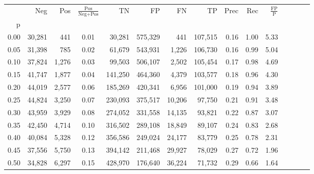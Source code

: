 \begin{tabular}{rrrcrrrrrrrrrrr}
\toprule
{} &     Neg &     Pos & $\frac{\text{Pos}}{\text{Neg}+\text{Pos}}$ &       TN &       FP &       FN &       TP &  Prec &   Rec & $\frac{\text{FP}}{\text{P}}$ \\
p    &         &         &                                            &          &          &          &          &       &       &                              \\
\midrule
0.00 &  30,281 &     441 &                                       0.01 &   30,281 &  575,329 &      441 &  107,515 &  0.16 &  1.00 &                         5.33 \\
0.05 &  31,398 &     785 &                                       0.02 &   61,679 &  543,931 &    1,226 &  106,730 &  0.16 &  0.99 &                         5.04 \\
0.10 &  37,824 &   1,276 &                                       0.03 &   99,503 &  506,107 &    2,502 &  105,454 &  0.17 &  0.98 &                         4.69 \\
0.15 &  41,747 &   1,877 &                                       0.04 &  141,250 &  464,360 &    4,379 &  103,577 &  0.18 &  0.96 &                         4.30 \\
0.20 &  44,019 &   2,577 &                                       0.06 &  185,269 &  420,341 &    6,956 &  101,000 &  0.19 &  0.94 &                         3.89 \\
0.25 &  44,824 &   3,250 &                                       0.07 &  230,093 &  375,517 &   10,206 &   97,750 &  0.21 &  0.91 &                         3.48 \\
0.30 &  43,959 &   3,929 &                                       0.08 &  274,052 &  331,558 &   14,135 &   93,821 &  0.22 &  0.87 &                         3.07 \\
0.35 &  42,450 &   4,714 &                                       0.10 &  316,502 &  289,108 &   18,849 &   89,107 &  0.24 &  0.83 &                         2.68 \\
0.40 &  40,084 &   5,328 &                                       0.12 &  356,586 &  249,024 &   24,177 &   83,779 &  0.25 &  0.78 &                         2.31 \\
0.45 &  37,556 &   5,750 &                                       0.13 &  394,142 &  211,468 &   29,927 &   78,029 &  0.27 &  0.72 &                         1.96 \\
0.50 &  34,828 &   6,297 &                                       0.15 &  428,970 &  176,640 &   36,224 &   71,732 &  0.29 &  0.66 &                         1.64 \\

\end{tabular}
